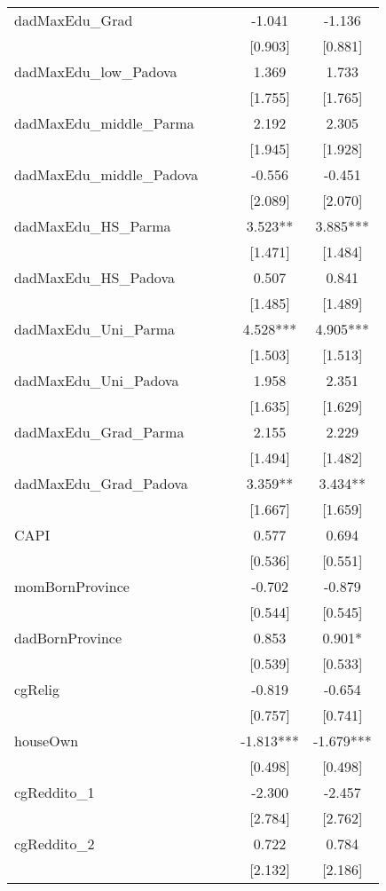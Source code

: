 \documentclass[]{article}
\begin{document}
\begin{tabular}{lcccc}
dadMaxEdu\_Grad &  &  & -1.041 & -1.136 \\
 &  &  & [0.903] & [0.881] \\
dadMaxEdu\_low\_Padova &  &  & 1.369 & 1.733 \\
 &  &  & [1.755] & [1.765] \\
dadMaxEdu\_middle\_Parma &  &  & 2.192 & 2.305 \\
 &  &  & [1.945] & [1.928] \\
dadMaxEdu\_middle\_Padova &  &  & -0.556 & -0.451 \\
 &  &  & [2.089] & [2.070] \\
dadMaxEdu\_HS\_Parma &  &  & 3.523** & 3.885*** \\
 &  &  & [1.471] & [1.484] \\
dadMaxEdu\_HS\_Padova &  &  & 0.507 & 0.841 \\
 &  &  & [1.485] & [1.489] \\
dadMaxEdu\_Uni\_Parma &  &  & 4.528*** & 4.905*** \\
 &  &  & [1.503] & [1.513] \\
dadMaxEdu\_Uni\_Padova &  &  & 1.958 & 2.351 \\
 &  &  & [1.635] & [1.629] \\
dadMaxEdu\_Grad\_Parma &  &  & 2.155 & 2.229 \\
 &  &  & [1.494] & [1.482] \\
dadMaxEdu\_Grad\_Padova &  &  & 3.359** & 3.434** \\
 &  &  & [1.667] & [1.659] \\
CAPI &  &  & 0.577 & 0.694 \\
 &  &  & [0.536] & [0.551] \\
momBornProvince &  &  & -0.702 & -0.879 \\
 &  &  & [0.544] & [0.545] \\
dadBornProvince &  &  & 0.853 & 0.901* \\
 &  &  & [0.539] & [0.533] \\
cgRelig &  &  & -0.819 & -0.654 \\
 &  &  & [0.757] & [0.741] \\
houseOwn &  &  & -1.813*** & -1.679*** \\
 &  &  & [0.498] & [0.498] \\
cgReddito\_1 &  &  & -2.300 & -2.457 \\
 &  &  & [2.784] & [2.762] \\
cgReddito\_2 &  &  & 0.722 & 0.784 \\
 &  &  & [2.132] & [2.186] \\

\end{tabular}
\end{document}

